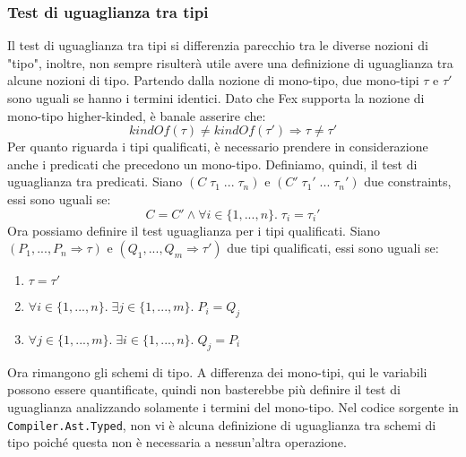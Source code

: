 \documentclass[10pt,a4paper]{article}
\begin{document}
\subsubsection{Test di uguaglianza tra tipi}
Il test di uguaglianza tra tipi si differenzia parecchio tra le diverse nozioni di "tipo", inoltre, non sempre risulterà
utile avere una definizione di uguaglianza tra alcune nozioni di tipo. Partendo dalla nozione di mono-tipo, due
mono-tipi $ \tau $ e $ \tau' $ sono uguali se hanno i termini identici. Dato che Fex supporta la nozione di mono-tipo
higher-kinded, è banale asserire che:
\[ kindOf(\tau) \neq kindOf(\tau') \Longrightarrow \tau \neq \tau' \]
Per quanto riguarda i tipi qualificati, è necessario prendere in considerazione anche i predicati che precedono un
mono-tipo. Definiamo, quindi, il test di uguaglianza tra predicati. Siano $ (C \; \tau_1 \; ... \; \tau_n) $ e
$ (C' \; \tau_1' \; ... \; \tau_n') $ due constraints, essi sono uguali se:
\[ C = C' \wedge \forall i \in \{1, ..., n\}. \; \tau_i = \tau_i' \]
Ora possiamo definire il test uguaglianza per i tipi qualificati. Siano $ (P_1, ..., P_n \Rightarrow \tau) $ e
$ (Q_1, ..., Q_m \Rightarrow \tau') $ due tipi qualificati, essi sono uguali se:
\begin{enumerate}
    \item $ \tau = \tau' $
    \item $ \forall i \in \{1, ..., n\}. \; \exists j \in \{1, ..., m\}. \; P_i = Q_j $
    \item $ \forall j \in \{1, ..., m\}. \; \exists i \in \{1, ..., n\}. \; Q_j = P_i $
\end{enumerate}
Ora rimangono gli schemi di tipo. A differenza dei mono-tipi, qui le variabili possono essere quantificate, quindi non
basterebbe più definire il test di uguaglianza analizzando solamente i termini del mono-tipo. Nel codice sorgente in
\texttt{Compiler.Ast.Typed}, non vi è alcuna definizione di uguaglianza tra schemi di tipo poiché questa non è necessaria
a nessun'altra operazione.
\end{document}
